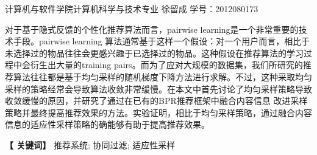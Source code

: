 \newpage


\centerline{\fangsong\bf{}}


\vskip 1cm

\begin{center}
	\kaishu
	\hspace{2cm}计算机与软件学院计算机科学与技术专业 \quad 徐留成 
	\vspace{5bp}
	\newline
	学号：2012080173
\end{center}

\vskip 10bp

{
\kaishu	
{} 
对于基于隐式反馈的个性化推荐算法而言，pairwise learning是一个非常重要的技术手段。pairwise learning 算法通常基于这样一个假设：对一个用户而言，相比于未选择过的物品往往会更感兴趣于已选择过的物品。这种假设在推荐算法的学习过程中会衍生出大量的training pairs。而为了应对大规模的数据集，我们所研究的推荐算法往往都是基于均匀采样的随机梯度下降方法进行求解。不过，这种采取均匀采样的策略经常会导致算法收敛非常缓慢。在本文中首先讨论了均匀采样策略导致收敛缓慢的原因，并研究了通过在已有的BPR推荐框架中融合内容信息 改进采样策略并最终提高推荐效果的方法。实验证明，相比于均匀采样策略，通过融合内容信息的适应性采样策略的确能够有助于提高推荐效果。

\vskip 10bp

\hspace{5bp} {\textbf{【 关键词】}} 
推荐系统; 协同过滤; 适应性采样  
}